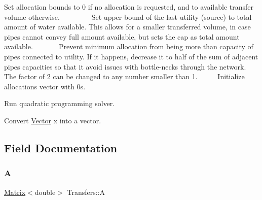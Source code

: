 Set allocation bounds to 0 if no allocation is requested, and to available transfer volume otherwise. ~\newline
~\newline
~\newline
~\newline
~\newline
 Set upper bound of the last utility (source) to total amount of water available. This allows for a smaller transferred volume, in case pipes cannot convey full amount available, but sets the cap as total amount available. ~\newline
~\newline
~\newline
~\newline
 Prevent minimum allocation from being more than capacity of pipes connected to utility. If it happens, decrease it to half of the sum of adjacent pipes capacities so that it avoid issues with bottle-\/necks through the network. The factor of 2 can be changed to any number smaller than 1. ~\newline
~\newline
~\newline
 Initialize allocations vector with 0s.

Run quadratic programming solver.

Convert \mbox{\hyperlink{classVector}{Vector}} x into a vector. 

\subsection{Field Documentation}
\mbox{\label{classTransfers_a2acc8cfe6a1978d2468be289db636226_a2acc8cfe6a1978d2468be289db636226}} 
\subsubsection{\texorpdfstring{A}{A}}
{\footnotesize\ttfamily \mbox{\hyperlink{classMatrix}{Matrix}}$<$double$>$ Transfers\+::A\hspace{0.3cm}{\ttfamily [private]}}

\mbox{\label{classTransfers_a1c2d27eb4e9294e32f04b5e7d929e71f_a1c2d27eb4e9294e32f04b5e7d929e71f}} 
